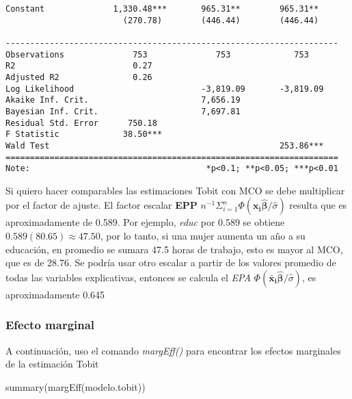 \documentclass[
  letterpaper,
  DIV=11,
  numbers=noendperiod]{scrreprt}
\newenvironment{Shaded}{\begin{snugshade}}{\end{snugshade}}
\newcommand{\FunctionTok}[1]{\textcolor[rgb]{0.28,0.35,0.67}{#1}}
\newcommand{\NormalTok}[1]{\textcolor[rgb]{0.00,0.23,0.31}{#1}}
\begin{document}
\begin{verbatim}
Constant              1,330.48***       965.31**        965.31**    
                        (270.78)        (446.44)        (446.44)    
                                                                    
--------------------------------------------------------------------
Observations              753              753             753      
R2                        0.27                                      
Adjusted R2               0.26                                      
Log Likelihood                          -3,819.09       -3,819.09   
Akaike Inf. Crit.                       7,656.19                    
Bayesian Inf. Crit.                     7,697.81                    
Residual Std. Error      750.18                                     
F Statistic             38.50***                                    
Wald Test                                               253.86***   
====================================================================
Note:                                    *p<0.1; **p<0.05; ***p<0.01
\end{verbatim}

Si quiero hacer comparables las estimaciones Tobit con MCO se debe
multiplicar por el factor de ajuste. El factor escalar \textbf{EPP}
\(n^{-1}\Sigma_{i=1}^n\Phi(\mathbf{x_i\hat{\beta}}/\hat{\sigma})\)
resulta que es aproximadamente de 0.589. Por ejemplo, \emph{educ} por
0.589 se obtiene \(0.589(80.65)\approx47.50\), por lo tanto, si una
mujer aumenta un año a su educación, en promedio se sumara 47.5 horas de
trabajo, esto es mayor al MCO, que es de 28.76. Se podría usar otro
escalar a partir de los valores promedio de todas las variables
explicativas, entonces se calcula el \emph{EPA}
\(\Phi(\mathbf{\bar{x}_i\hat{\beta}}/\hat{\sigma})\), es aproximadamente
0.645

\subsubsection{Efecto marginal}\label{efecto-marginal}

A continuación, uso el comando \emph{margEff()} para encontrar los
efectos marginales de la estimación Tobit

\begin{Shaded}
\begin{Highlighting}[]
\FunctionTok{summary}\NormalTok{(}\FunctionTok{margEff}\NormalTok{(modelo.tobit))}
\end{Highlighting}
\end{Shaded}
\end{document}
